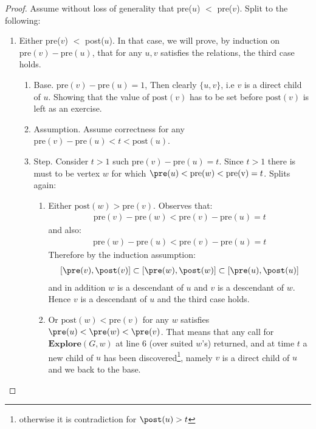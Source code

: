   \begin{proof} 
      Assume without loss of generality that pre($u$) $<$ pre($v$). Split to the following:
	\begin{enumerate}
	  \item Either pre($v$) $<$ post($u$). In that case, we will prove, by induction on $\text{pre}(v)-\text{pre}(u)$, that for any $u,v$ satisfies the relations, the third case holds. 
	    \begin{enumerate}
	      \item Base. $\text{pre}(v)-\text{pre}(u) = 1$, Then clearly $\{u,v\}$, i.e $v$ is a direct child of $u$. Showing that the value of $\text{post}(v)$ has to be set before  $\text{post}(v)$ is left as an exercise. 
	      \item Assumption. Assume correctness for any $\text{pre}(v)-\text{pre}(u) < t < \text{post}(u)$.
	      \item Step. Consider $t > 1$ such  $\text{pre}(v)-\text{pre}(u) = t$. Since $t > 1$ there is must to be vertex $w$ for which $\pre(u) < \text{pre}(w) < \text{pre(v)} = t$. Splits again:  
		\begin{enumerate}
		  \item Either $\text{post}(w) > \text{pre}(v)$. Observes that: \begin{equation*}
		      \begin{split}
\text{pre}(v) - \text{pre}(w) < \text{pre}(v) - \text{pre}(u) = t
		      \end{split}
		    \end{equation*}
		     and also: \begin{equation*}
		       \begin{split}
\text{pre}(w) - \text{pre}(u) < \text{pre}(v) - \text{pre}(u) = t
		       \end{split}
		     \end{equation*}
		      Therefore by the induction assumption: \begin{equation*}
			\begin{split}
[\pre(v),\post(v)] \subset [\pre(w),\post(w)]\subset [\pre(u),\post(u)]
			\end{split}
		      \end{equation*} and in addition $w$ is a descendant of $u$ and $v$ is a descendant of $w$. Hence $v$ is a descendant of $u$ and the third case holds. 
		    \item Or $\text{post}(w) < \text{pre}(v)$ for any $w$ satisfies $\pre(u) < \pre(w) < \pre(v)$. That means that any call for $\textbf{Explore}(G,w)$ at line $6$ (over suited $w$'s) returned, and at time $t$ a new child of $u$ has been discovered\footnote{otherwise it is contradiction for $\post(u) > t$}, namely $v$ is a direct child of $u$ and we back to the base.
		\end{enumerate}
	    \end{enumerate}
	    

\end{enumerate}
\end{proof}

